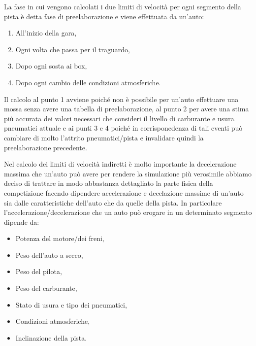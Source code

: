 \documentclass[11pt,a4paper]{report}
\begin{document}
La fase in cui vengono calcolati i due limiti di velocità per ogni segmento della pista è detta fase di preelaborazione e viene effettuata da un'auto:
\begin{enumerate}
\item All'inizio della gara,
\item Ogni volta che passa per il traguardo,
\item Dopo ogni sosta ai box,
\item Dopo ogni cambio delle condizioni atmosferiche.
\end{enumerate}
Il calcolo al punto 1 avviene poiché non è possibile per un'auto effettuare una mossa senza avere una tabella di preelaborazione, al punto 2 per avere una stima più accurata dei valori necessari che consideri il livello di carburante e usura pneumatici attuale e ai punti 3 e 4 poiché in corrisponedenza di tali eventi può cambiare di molto l'attrito pneumatici/pista e invalidare quindi la preelaborazione precedente.

Nel calcolo dei limiti di velocità indiretti è molto importante la decelerazione massima che un'auto può avere per rendere la simulazione più verosimile abbiamo deciso di trattare in modo abbastanza dettagliato la parte fisica della competizione facendo dipendere accelerazione e decelazione massime di un'auto sia dalle caratteristiche dell'auto che da quelle della pista.
In particolare l'accelerazione/decelerazione che un auto può erogare in un determinato segmento dipende da:
\begin{itemize}
\item Potenza del motore/dei freni,
\item Peso dell'auto a secco,
\item Peso del pilota,
\item Peso del carburante,
\item Stato di usura e tipo dei pneumatici,
\item Condizioni atmosferiche,
\item Inclinazione della pista.
\end{itemize}
\end{document}
